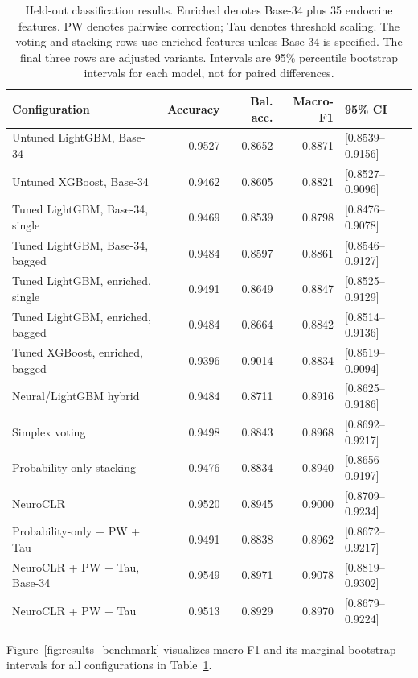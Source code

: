 \begin{table}[htbp]
\centering
\caption{Held-out classification results. Enriched denotes Base-34 plus 35 endocrine features. PW denotes pairwise correction; Tau denotes threshold scaling. The voting and stacking rows use enriched features unless Base-34 is specified. The final three rows are adjusted variants. Intervals are 95\% percentile bootstrap intervals for each model, not for paired differences.}
\label{tab:test_classification}
\begingroup
\small
\setlength{\tabcolsep}{4pt}
\begin{tabular}{@{}p{5.2cm}rrrl@{}}
\toprule
Configuration & Accuracy & Bal. acc. & Macro-F1 & 95\% CI \\
\midrule
Untuned LightGBM, Base-34 & 0.9527 & 0.8652 & 0.8871 & [0.8539--0.9156] \\
Untuned XGBoost, Base-34 & 0.9462 & 0.8605 & 0.8821 & [0.8527--0.9096] \\
Tuned LightGBM, Base-34, single & 0.9469 & 0.8539 & 0.8798 & [0.8476--0.9078] \\
Tuned LightGBM, Base-34, bagged & 0.9484 & 0.8597 & 0.8861 & [0.8546--0.9127] \\
Tuned LightGBM, enriched, single & 0.9491 & 0.8649 & 0.8847 & [0.8525--0.9129] \\
Tuned LightGBM, enriched, bagged & 0.9484 & 0.8664 & 0.8842 & [0.8514--0.9136] \\
Tuned XGBoost, enriched, bagged & 0.9396 & 0.9014 & 0.8834 & [0.8519--0.9094] \\
Neural/LightGBM hybrid & 0.9484 & 0.8711 & 0.8916 & [0.8625--0.9186] \\
Simplex voting & 0.9498 & 0.8843 & 0.8968 & [0.8692--0.9217] \\
Probability-only stacking & 0.9476 & 0.8834 & 0.8940 & [0.8656--0.9197] \\
NeuroCLR & 0.9520 & 0.8945 & 0.9000 & [0.8709--0.9234] \\
\midrule
Probability-only + PW + Tau & 0.9491 & 0.8838 & 0.8962 & [0.8672--0.9217] \\
NeuroCLR + PW + Tau, Base-34 & 0.9549 & 0.8971 & 0.9078 & [0.8819--0.9302] \\
NeuroCLR + PW + Tau & 0.9513 & 0.8929 & 0.8970 & [0.8679--0.9224] \\
\bottomrule
\end{tabular}
\endgroup
\end{table}


Figure~\ref{fig:results_benchmark} visualizes macro-F1 and its marginal bootstrap intervals for all configurations in Table~\ref{tab:test_classification}.

